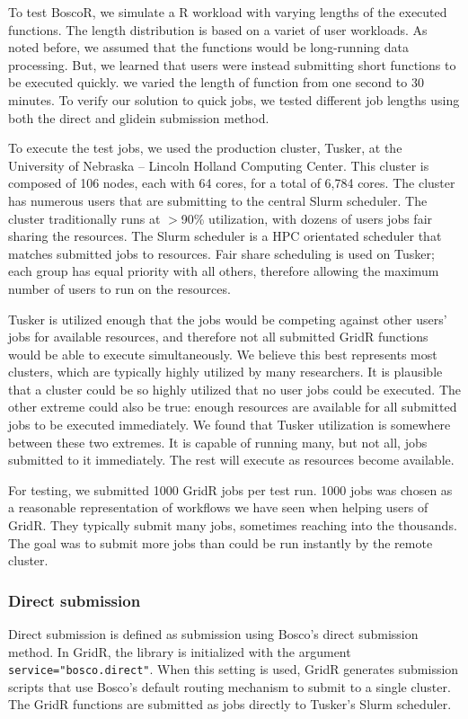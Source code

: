 To test BoscoR, we simulate a R workload with varying lengths of the executed functions.  The length distribution is based on a variet of user workloads.  As noted before, we assumed that the functions would be long-running data processing.  But, we learned that users were instead submitting short functions to be executed quickly.  we varied the length of function from one second to 30 minutes.  To verify our solution to quick jobs, we tested different job lengths using both the direct and glidein submission method.

To execute the test jobs, we used the production cluster, Tusker, at the University of Nebraska -- Lincoln Holland Computing Center.  This cluster is composed of 106 nodes, each with 64 cores, for a total of 6,784 cores.  The cluster has numerous users that are submitting to the central Slurm \cite{yoo2003slurm} scheduler.  The cluster traditionally runs at $>$90\% utilization, with dozens of users jobs fair sharing the resources.  The Slurm scheduler is a HPC orientated scheduler that matches submitted jobs to resources.  Fair share scheduling is used on Tusker;  each group has equal priority with all others, therefore allowing the maximum number of users to run on the resources.

Tusker is utilized enough that the jobs would be competing against other users' jobs for available resources, and therefore not all submitted GridR functions would be able to execute simultaneously.  We believe this best represents most clusters, which are typically highly utilized by many researchers.  It is plausible that a cluster could be so highly utilized that no user jobs could be executed. The other extreme could also be true: enough resources are available for all submitted jobs to be executed immediately.  We found that Tusker utilization is somewhere between these two extremes.  It is capable of running many, but not all, jobs submitted to it immediately.  The rest will execute as resources become available.

For testing, we submitted 1000 GridR jobs per test run. 1000 jobs was chosen as a reasonable representation of workflows we have seen when helping users of GridR.  They typically submit many jobs, sometimes reaching into the thousands.  The goal was to submit more jobs than could be run instantly by the remote cluster.

\subsubsection{Direct submission}
Direct submission is defined as submission using Bosco's direct submission method.  In GridR, the library is initialized with the argument \texttt{service="bosco.direct"}.  When this setting is used, GridR generates submission scripts that use Bosco's default routing mechanism to submit to a single cluster.  The GridR functions are submitted as jobs directly to Tusker's Slurm scheduler.

